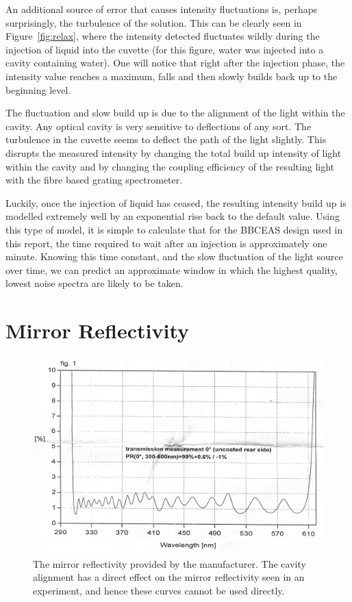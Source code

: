 An additional source of error that causes intensity fluctuations is, perhaps
surprisingly, the turbulence of the solution. This can be clearly seen in
Figure~\ref{fig:relax}, where the intensity detected fluctuates wildly during
the injection of liquid into the cuvette (for this figure, water was injected
into a cavity containing water). One will notice that right after the injection
phase, the intensity value reaches a maximum, falls and then slowly builds back
up to the beginning level.

The fluctuation and slow build up is due to the alignment of the light within
the cavity. Any optical cavity is very sensitive to deflections of any sort.
The turbulence in the cuvette seems to deflect the path of the light slightly.
This disrupts the measured intensity by changing the total build up intensity
of light within the cavity and by changing the coupling efficiency of the
resulting light with the fibre based grating spectrometer.

Luckily, once the injection of liquid has ceased, the resulting intensity build
up is modelled extremely well by an exponential rise back to the default
value. Using this type of model, it is simple to calculate that for the
\ac{BBCEAS} design used in this report, the time required to wait after an
injection is approximately one minute.
Knowing this time constant, and the slow fluctuation of the light source over
time, we can predict an approximate window in which the highest quality,
lowest noise spectra are likely to be taken.

\section{Mirror Reflectivity}\label{sec:mirror_considerations}

\begin{figure}
\begin{center}
\includegraphics[width=\textwidth]{figures/mirrors.jpg}
\end{center}
\caption{The mirror reflectivity provided by the manufacturer. The cavity alignment has a direct effect on the mirror reflectivity seen in an experiment, and hence these curves cannot be used directly.}
\label{fig:mirror}
\end{figure}

